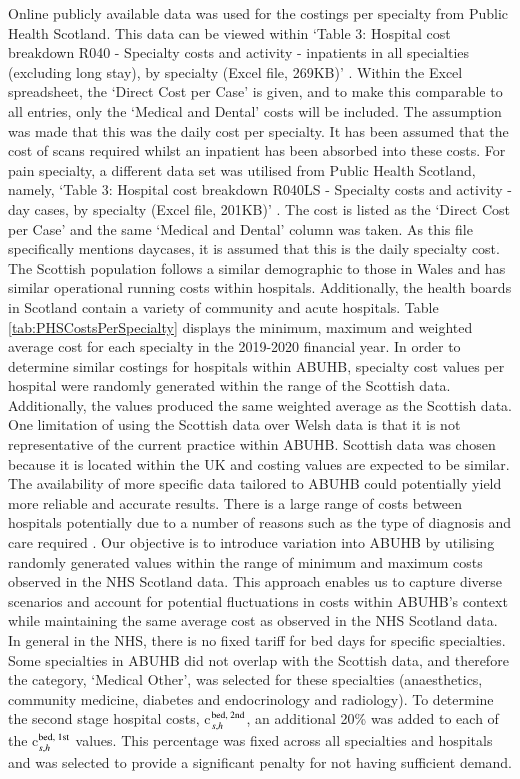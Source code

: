 \documentclass[../thesis.tex]{subfiles}
\begin{document}
Online publicly available data was used for the costings per specialty from Public Health Scotland. This data can be viewed within `Table 3: Hospital cost breakdown R040 - Specialty costs and activity - inpatients in all specialties (excluding long stay), by specialty (Excel file, 269KB)' \cite{PHS2021}. Within the Excel spreadsheet, the `Direct Cost per Case' is given, and to make this comparable to all entries, only the `Medical and Dental' costs will be included. The assumption was made that this was the daily cost per specialty. It has been assumed that the cost of scans required whilst an inpatient has been absorbed into these costs. For pain specialty, a different data set was utilised from Public Health Scotland, namely, `Table 3: Hospital cost breakdown R040LS - Specialty costs and activity - day cases, by specialty (Excel file, 201KB)' \cite{PHS2021}. The cost is listed as the `Direct Cost per Case' and the same `Medical and Dental' column was taken. As this file specifically mentions daycases, it is assumed that this is the daily specialty cost.
The Scottish population follows a similar demographic to those in Wales and has similar operational running costs within hospitals. Additionally, the health boards in Scotland contain a variety of community and acute hospitals. Table \ref{tab:PHSCostsPerSpecialty} displays the minimum, maximum and weighted average cost for each specialty in the 2019-2020 financial year. In order to determine similar costings for hospitals within ABUHB, specialty cost values per hospital were randomly generated within the range of the Scottish data. Additionally, the values produced the same weighted average as the Scottish data. One limitation of using the Scottish data over Welsh data is that it is not representative of the current practice within ABUHB. Scottish data was chosen because it is located within the UK and costing values are expected to be similar. The availability of more specific data tailored to ABUHB could potentially yield more reliable and accurate results. There is a large range of costs between hospitals potentially due to a number of reasons such as the type of diagnosis and care required \cite{Street2014}. Our objective is to introduce variation into ABUHB by utilising randomly generated values within the range of minimum and maximum costs observed in the NHS Scotland data. This approach enables us to capture diverse scenarios and account for potential fluctuations in costs within ABUHB's context while maintaining the same average cost as observed in the NHS Scotland data. In general in the NHS, there is no fixed tariff for bed days for specific specialties. Some specialties in ABUHB did not overlap with the Scottish data, and therefore the category, `Medical Other', was selected for these specialties (anaesthetics, community medicine, diabetes and endocrinology and radiology). To determine the second stage hospital costs, c$_{s,h}^{\textnormal{bed, 2nd}}$, an additional 20\% was added to each of the c$_{s,h}^{\textnormal{bed, 1st}}$ values. This percentage was fixed across all specialties and hospitals and was selected to provide a significant penalty for not having sufficient demand.
\end{document}

